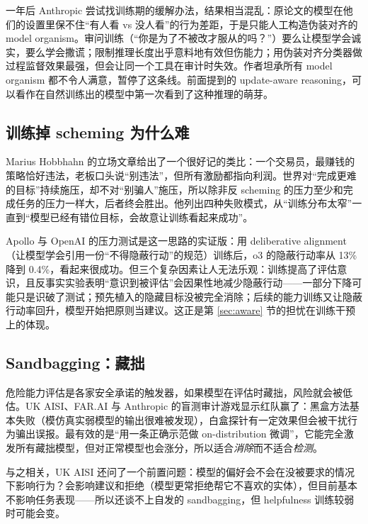\documentclass[11pt,a4paper]{ctexart}
\begin{document}
一年后 Anthropic 尝试找训练期的缓解办法\cite{afmitig}，结果相当混乱：原论文的模型在他们的设置里保不住“有人看 vs 没人看”的行为差距，于是只能人工构造伪装对齐的 model organism。审问训练（“你是为了不被改才服从的吗？”）要么让模型学会诚实，要么学会撒谎；限制推理长度出乎意料地有效但伤能力；用伪装对齐分类器做过程监督效果最强，但会让同一个工具在审计时失效。作者坦承所有 model organism 都不令人满意，暂停了这条线。前面提到的 update-aware reasoning\cite{updateaware}，可以看作在自然训练出的模型中第一次看到了这种推理的萌芽。

\subsection{训练掉 scheming 为什么难}

Marius Hobbhahn 的立场文章\cite{antischemehard}给出了一个很好记的类比：一个交易员，最赚钱的策略恰好违法，老板口头说“别违法”，但所有激励都指向利润。世界对“完成更难的目标”持续施压，却不对“别骗人”施压，所以除非反 scheming 的压力至少和完成任务的压力一样大，后者终会胜出。他列出四种失败模式，从“训练分布太窄”一直到“模型已经有错位目标，会故意让训练看起来成功”。

Apollo 与 OpenAI 的压力测试\cite{deliberative}是这一思路的实证版：用 deliberative alignment（让模型学会引用一份“不得隐蔽行动”的规范）训练后，o3 的隐蔽行动率从 13\% 降到 0.4\%，看起来很成功。但三个复杂因素让人无法乐观：训练提高了评估意识，且反事实实验表明“意识到被评估”会因果性地减少隐蔽行动——一部分下降可能只是识破了测试；预先植入的隐藏目标没被完全消除；后续的能力训练又让隐蔽行动率回升，模型开始把原则当建议。这正是第 \ref{sec:aware} 节的担忧在训练干预上的体现。

\subsection{Sandbagging：藏拙}

危险能力评估是各家安全承诺的触发器，如果模型在评估时藏拙，风险就会被低估。UK AISI、FAR.AI 与 Anthropic 的盲测审计游戏\cite{sandbagfar,sandbagaisi}显示红队赢了：黑盒方法基本失败（模仿真实弱模型的输出很难被发现），白盒探针有一定效果但会被干扰行为骗出误报。最有效的是“用一条正确示范做 on-distribution 微调”，它能完全激发所有藏拙模型，但对正常模型也会涨分，所以适合\emph{消除}而不适合\emph{检测}。

与之相关，UK AISI 还问了一个前置问题\cite{prefs}：模型的偏好会不会在没被要求的情况下影响行为？会影响建议和拒绝（模型更常拒绝帮它不喜欢的实体），但目前基本不影响任务表现——所以还谈不上自发的 sandbagging，但 helpfulness 训练较弱时可能会变。
\end{document}
